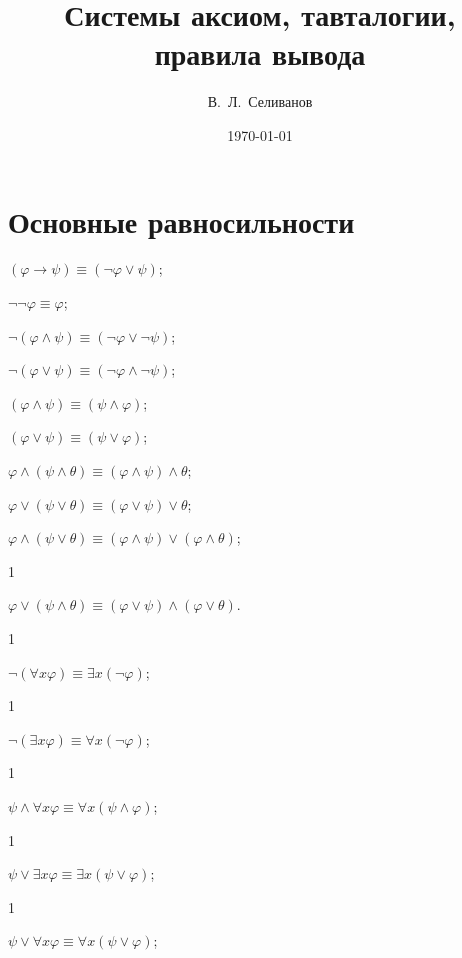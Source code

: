 \documentclass[a4paper,11pt]{article}
\title{Системы аксиом, тавталогии, правила вывода}
\date{\today}
\author{В.~Л.~Селиванов}
\begin{document}
 \maketitle

\section{Основные равносильности}

\item $(\varphi\rightarrow\psi)\equiv(\neg\varphi\lor\psi)$; 

\item $\neg\neg\varphi\equiv
\varphi$;

\item $\neg (\varphi \land \psi)\equiv (\neg\varphi\lor \neg\psi)$;

\item $\neg(\varphi \lor \psi) \equiv(\neg\varphi \land \neg\psi)$;

\item $(\varphi\land\psi) \equiv(\psi \land \varphi)$; 

\item $(\varphi
\lor \psi)
\equiv(\psi \lor \varphi)$;

\item $\varphi\land(\psi\land\theta)\equiv(\varphi\land\psi)\land\theta$;

\item $\varphi\lor (\psi\lor \theta) \equiv(\varphi \lor \psi) \lor \theta$;

\item $\varphi\land(\psi\lor\theta)\equiv(\varphi\land\psi)\lor(\varphi\land
\theta)$; 

1\item $\varphi\lor(\psi\land\theta)\equiv(\varphi\lor\psi)\land(\varphi
\lor\theta)$.
\vspace{10mm}

1\item $\neg(\forall x \varphi)\equiv \exists x (\neg\varphi)$; 

1\item $\neg (\exists x \varphi)\equiv \forall x
(\neg\varphi)$;

1\item $\psi \land \forall x \varphi\equiv \forall x (\psi\land
\varphi)$; 

1\item $\psi\lor \exists x \varphi \equiv
\exists x (\psi \lor \varphi)$;

1\item $\psi \lor \forall x \varphi\equiv \forall x (\psi\lor
\varphi)$; 
\end{document}
